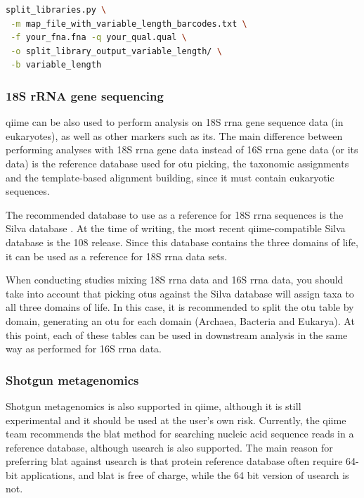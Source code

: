 \begin{lstlisting}[language=bash]
split_libraries.py \
 -m map_file_with_variable_length_barcodes.txt \
 -f your_fna.fna -q your_qual.qual \
 -o split_library_output_variable_length/ \
 -b variable_length
\end{lstlisting}

\subsubsection{18S rRNA gene sequencing}
\gls{qiime} can be also used to perform analysis on 18S \gls{rrna} gene sequence data
(in eukaryotes), as well as other markers such as \gls{its}. The main difference
between performing analyses with 18S \gls{rrna} gene data instead of 16S \gls{rrna} gene
data (or \gls{its} data) is the reference database used for \gls{otu} picking,
the taxonomic assignments and the template-based alignment building, since it must
contain eukaryotic sequences.

The recommended database to use as a reference for 18S \gls{rrna} sequences is
the Silva database \cite{Quast2013}. At the time of writing, the most recent
\gls{qiime}-compatible Silva database is the 108 release. Since this database contains
the three domains of life, it can be used as a reference for 18S \gls{rrna} data sets.

When conducting studies mixing 18S \gls{rrna} data and 16S \gls{rrna} data, you
should take into account that picking \gls{otu}s against the Silva database will assign
taxa to all three domains of life. In this case, it is recommended to split the
\gls{otu} table by domain, generating an \gls{otu} for each domain (Archaea, Bacteria and Eukarya).
At this point, each of these tables can be used in downstream analysis in the same
way as performed for 16S \gls{rrna} data.

\subsubsection{Shotgun metagenomics}

Shotgun metagenomics is also supported in \gls{qiime}, although it is still experimental
and it should be used at the user's own risk. Currently, the \gls{qiime} team recommends
the blat method \cite{Kent2002} for searching nucleic acid sequence reads in a
reference database, although usearch \cite{Edgar2010} is also supported. The main
reason for preferring blat against usearch is that protein reference database often
require 64-bit applications, and blat is free of charge, while the 64 bit version of usearch is not.

